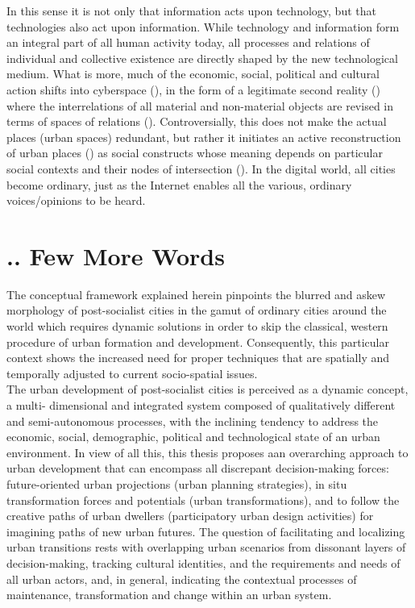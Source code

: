 \documentclass[11pt]{report}
\begin{document}
{{{In this sense it is not only that information acts upon technology, but that technologies also act upon information.
While technology and information form an integral part of all human activity today, all processes and relations of individual and collective existence are directly shaped by the new technological medium.
What is more, much of the economic, social, political and cultural action shifts into cyberspace (\href{Mitchell}{\citealt{mitchell_city_1996}}), in the form of a legitimate second reality (\href{Baudrillard}{\citealt{baudrillard_l_1983}}) where the interrelations of  all material and non-material objects are revised in terms of spaces of relations (\href{Graham}{\citealt{graham_relational_1999}}).
Controversially, this does not make the actual places (urban spaces) redundant, but rather it initiates an active reconstruction of urban places (\href{ref}{\citealt{graham_splintering_2001}}) as social constructs whose meaning depends on particular social contexts and their nodes of intersection (\href{ref}{\citealt{healey_treatment_2004}}).
In the digital world, all cities become ordinary, just as the Internet enables all the various, ordinary voices/opinions to be heard.

\section{.. Few More Words}

The conceptual framework explained herein pinpoints the blurred and askew morphology of post-socialist cities in the gamut of ordinary cities around the world which requires dynamic solutions in order to skip the classical, western procedure of urban formation and development. Consequently, this particular context shows the increased need for proper techniques that are spatially and temporally adjusted to current socio-spatial issues. 
\\

The urban development of post-socialist cities is perceived as a dynamic concept, a multi- dimensional and integrated system composed of qualitatively different and semi-autonomous processes, with the inclining tendency to address the economic, social, demographic, political and technological state of an urban environment.  In view of all this, this thesis proposes aan overarching approach to urban development that can encompass all discrepant decision-making forces: future-oriented urban projections (urban planning strategies), in situ transformation forces and potentials (urban transformations), and to follow the creative paths of urban dwellers (participatory urban design activities) for imagining paths of new urban futures.
The question of facilitating and localizing urban transitions rests with overlapping urban scenarios from dissonant layers of decision-making, tracking cultural identities, and the requirements and needs of all urban actors, and, in general, indicating the contextual processes of maintenance, transformation and change within an urban system.

}}}
\end{document}
